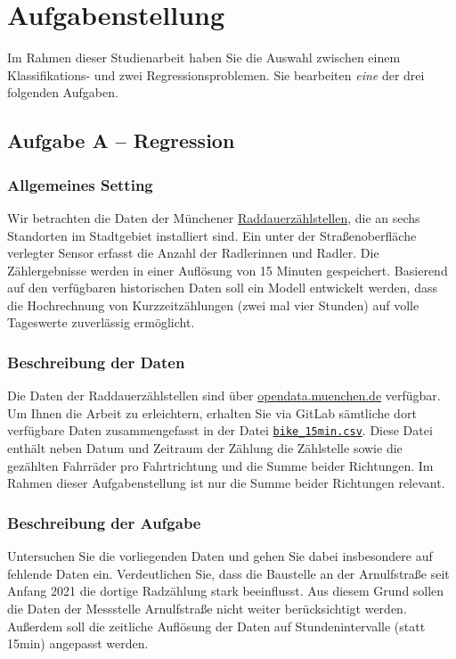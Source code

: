 \documentclass[11pt,a4paper]{article}
\begin{document}
\newpage


\section*{Aufgabenstellung}
Im Rahmen dieser Studienarbeit haben Sie die Auswahl zwischen einem Klassifikations- und zwei Regressionsproblemen. Sie bearbeiten \emph{eine} der drei folgenden Aufgaben.




\subsection*{Aufgabe A -- Regression}
\subsubsection*{Allgemeines Setting}
Wir betrachten die Daten der Münchener \href{https://opendata.muenchen.de/pages/raddauerzaehlstellen}{Raddauerzählstellen}, die an sechs Standorten im Stadtgebiet installiert sind. Ein unter der Straßenoberfläche verlegter Sensor erfasst die Anzahl der Radlerinnen und Radler. Die Zählergebnisse werden in einer Auflösung von 15 Minuten gespeichert. Basierend auf den verfügbaren historischen Daten soll ein Modell entwickelt werden, dass die Hochrechnung von Kurzzeitzählungen (zwei mal vier Stunden) auf volle Tageswerte zuverlässig ermöglicht.

\subsubsection*{Beschreibung der Daten}
Die Daten der Raddauerzählstellen sind über \href{https://opendata.muenchen.de/dataset?tags=Raddauerz%C3%A4hlstellen}{opendata.muenchen.de} verfügbar. Um Ihnen die Arbeit zu erleichtern, erhalten Sie via GitLab sämtliche dort verfügbare Daten zusammengefasst in der Datei \href{https://gitlab.lrz.de/christian-moeller/machine-learning/-/raw/main/Studienarbeit/data/bike_15min.csv}{\texttt{bike\_15min.csv}}. 
Diese Datei enthält neben Datum und Zeitraum der Zählung die Zählstelle sowie die gezählten Fahrräder pro Fahrtrichtung und die Summe beider Richtungen. Im Rahmen dieser Aufgabenstellung ist nur die Summe beider Richtungen relevant.

\subsubsection*{Beschreibung der Aufgabe}
Untersuchen Sie die vorliegenden Daten und gehen Sie dabei insbesondere auf fehlende Daten ein. Verdeutlichen Sie, dass die Baustelle an der Arnulfstraße seit Anfang 2021 die dortige Radzählung stark beeinflusst. Aus diesem Grund sollen die Daten der Messstelle Arnulfstraße nicht weiter berücksichtigt werden.
Außerdem soll die zeitliche Auflösung der Daten auf Stundenintervalle (statt 15min) angepasst werden.
\end{document}
